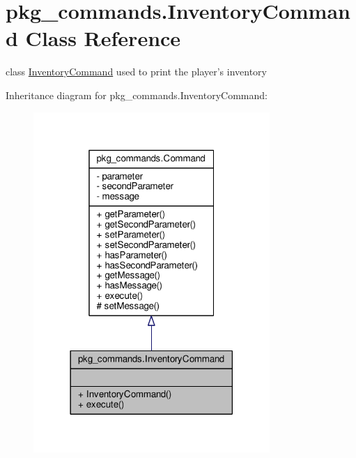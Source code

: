 \hypertarget{classpkg__commands_1_1InventoryCommand}{\section{pkg\-\_\-commands.\-Inventory\-Command Class Reference}
\label{classpkg__commands_1_1InventoryCommand}
}


class \hyperlink{classpkg__commands_1_1InventoryCommand}{Inventory\-Command} used to print the player's inventory  




Inheritance diagram for pkg\-\_\-commands.\-Inventory\-Command\-:
\nopagebreak
\begin{figure}[H]
\begin{center}
\leavevmode
\includegraphics[width=254pt]{classpkg__commands_1_1InventoryCommand__inherit__graph}
\end{center}
\end{figure}


